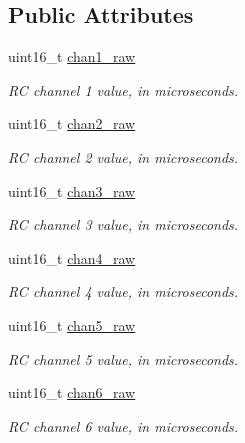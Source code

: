 \subsection*{Public Attributes}
\begin{DoxyCompactItemize}
\item 
uint16\+\_\+t \hyperlink{struct____mavlink__rc__channels__override__t_aeb8348ef82cccce6d514fdf1d2a4d216}{chan1\+\_\+raw}
\begin{DoxyCompactList}\small\item\em R\+C channel 1 value, in microseconds. \end{DoxyCompactList}\item 
uint16\+\_\+t \hyperlink{struct____mavlink__rc__channels__override__t_ab3632a873125a666e50f889d854a41d4}{chan2\+\_\+raw}
\begin{DoxyCompactList}\small\item\em R\+C channel 2 value, in microseconds. \end{DoxyCompactList}\item 
uint16\+\_\+t \hyperlink{struct____mavlink__rc__channels__override__t_aaf6d972bf21b65c73095fc5c45aff71a}{chan3\+\_\+raw}
\begin{DoxyCompactList}\small\item\em R\+C channel 3 value, in microseconds. \end{DoxyCompactList}\item 
uint16\+\_\+t \hyperlink{struct____mavlink__rc__channels__override__t_afc315c11bfffdd9aa051799c5d2d0fae}{chan4\+\_\+raw}
\begin{DoxyCompactList}\small\item\em R\+C channel 4 value, in microseconds. \end{DoxyCompactList}\item 
uint16\+\_\+t \hyperlink{struct____mavlink__rc__channels__override__t_a97c62336395d208d02837ca92085f3ac}{chan5\+\_\+raw}
\begin{DoxyCompactList}\small\item\em R\+C channel 5 value, in microseconds. \end{DoxyCompactList}\item 
uint16\+\_\+t \hyperlink{struct____mavlink__rc__channels__override__t_a8bef6b7819abe782e905da536c34b11d}{chan6\+\_\+raw}
\begin{DoxyCompactList}\small\item\em R\+C channel 6 value, in microseconds. \end{DoxyCompactList}\item 

\end{DoxyCompactItemize}
